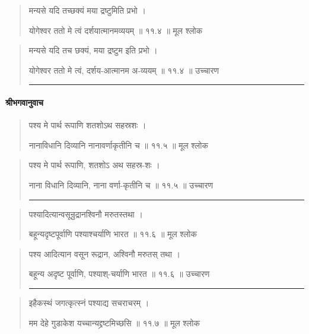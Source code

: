 \begin{quotation} 

मन्यसे यदि तच्छक्यं मया द्रष्टुमिति प्रभो  ।  

योगेश्वर ततो मे त्वं दर्शयात्मानमव्ययम्‌  ॥ ११.४ ॥  मूल श्लोक
\end{quotation}

\begin{quotation}

मन्यसे यदि तच छक्यं, मया द्रष्टुम इति प्रभो  ।  

योगेश्वर ततो मे त्वं, दर्शय-आत्मानम अ-व्ययम्‌  ॥ ११.४ ॥  उच्चारण

\noindent\rule{16cm}{0.4pt} 
\end{quotation}




\paragraph{\sanskrit श्रीभगवानुवाच}
\begin{quotation} 
पश्य मे पार्थ रूपाणि शतशोऽथ सहस्रशः  ।  

नानाविधानि दिव्यानि नानावर्णाकृतीनि च  ॥ ११.५ ॥  मूल श्लोक
\end{quotation}

\begin{quotation}
पश्य मे पार्थ रूपाणि, शतशोऽ अथ सहस्र-शः  ।  

नाना विधानि दिव्यानि, नाना वर्णा-कृतीनि च  ॥ ११.५ ॥  उच्चारण

\noindent\rule{16cm}{0.4pt} 
\end{quotation}


\begin{quotation} 

पश्यादित्यान्वसून्रुद्रानश्विनौ मरुतस्तथा  ।  

बहून्यदृष्टपूर्वाणि पश्याश्चर्याणि भारत  ॥ ११.६ ॥  मूल श्लोक
\end{quotation}

\begin{quotation}

पश्य आदित्यान वसून रूद्रान, अश्विनौ मरुतस् तथा  ।  

बहून्य अदृष्ट पूर्वाणि, पश्याश्-चर्याणि भारत  ॥ ११.६ ॥  उच्चारण

\noindent\rule{16cm}{0.4pt} 
\end{quotation}


\begin{quotation} 

इहैकस्थं जगत्कृत्स्नं पश्याद्य सचराचरम्‌  ।  

मम देहे गुडाकेश यच्चान्यद्द्रष्टमिच्छसि  ॥ ११.७ ॥  मूल श्लोक
\end{quotation}

